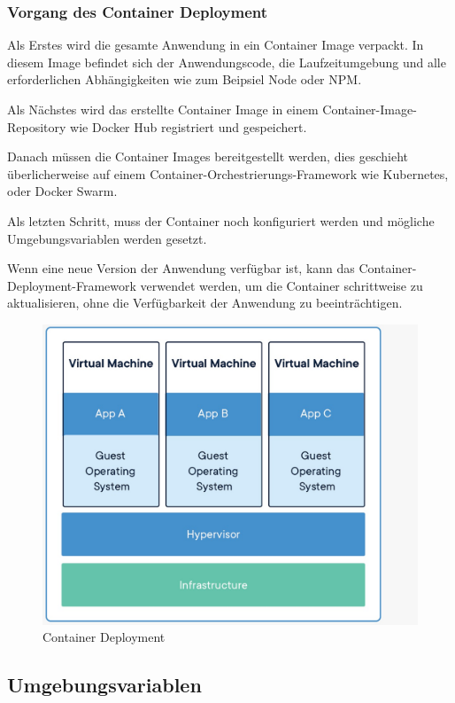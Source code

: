 \subsubsection{Vorgang des Container Deployment}

Als Erstes wird die gesamte Anwendung in ein Container Image verpackt. In diesem Image befindet sich der Anwendungscode, die Laufzeitumgebung und alle erforderlichen Abhängigkeiten wie zum Beipsiel Node oder NPM.

Als Nächstes wird das erstellte Container Image in einem Container-Image-Repository wie Docker Hub registriert und gespeichert.

Danach müssen die Container Images bereitgestellt werden, dies geschieht überlicherweise auf einem Container-Orchestrierungs-Framework wie Kubernetes, oder Docker Swarm.

Als letzten Schritt, muss der Container noch konfiguriert werden und mögliche Umgebungsvariablen werden gesetzt.

Wenn eine neue Version der Anwendung verfügbar ist, kann das Container-Deployment-Framework verwendet werden, um die Container schrittweise zu aktualisieren, ohne die Verfügbarkeit der Anwendung zu beeinträchtigen.


\begin{figure}[h!]
    \centering
    \includegraphics[width=0.8\linewidth]{pics/container_deployment.jpeg}
    \caption{Container Deployment}
    \label{fig:enter-label}
\end{figure}

\subsection{Umgebungsvariablen}

